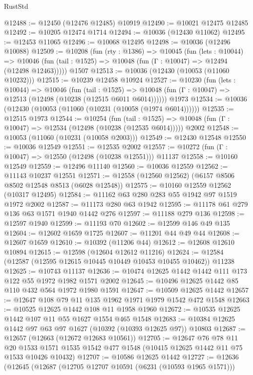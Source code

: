 \begin{lexlean}{RustStd}
\begin{coremodule}
{{@12488 := @12450 (@12476 @12485) @10919
@12490 := @10021 @12475 @12485
@12492 := @10205 @12474 @1714
@12494 := @10036 (@12430 @11062)
@12495 := @12453 @11065
@12496 := @10068 @12495
@12498 := @10036 (@12496 @10088)
@12509 := @10208
    (fun (rty : @1386) =>
    @10045
      (fun (lets : @10044) =>
      @10046 (fun (tail : @1525) => @10048 (fun (Γ : @10047) => @12494 (@12498 @12463)))))
    @1507
@12513 := @10036 (@12430 (@10053 (@11060 @10232)))
@12515 := @10239 @12458 @10924
@12527 := @10230
    (fun (lets : @10044) =>
    @10046
      (fun (tail : @1525) =>
      @10048 (fun (Γ : @10047) => @12513 (@12498 (@10238 (@12515 @6011 @6014))))))
    @1973
@12534 := @10036 (@12430 (@10053 (@11060 (@10231 (@10058 (@1974 @6014))))))
@12535 := @12515 @1973
@12544 := @10254
    (fun (tail : @1525) => @10048 (fun (Γ : @10047) => @12534 (@12498 (@10238 (@12535 @6014)))))
    @2002
@12548 := @10053 (@11060 (@10231 (@10058 @2003)))
@12549 := @12430 @12548
@12550 := @10036 @12549
@12551 := @12535 @2002
@12557 := @10272 (fun (Γ : @10047) => @12550 (@12498 (@10238 @12551))) @11137
@12558 := @10160 @12549
@12559 := @12496 @11140
@12560 := @10036 @12559
@12562 := @11143 @10237 @12551
@12571 := @12558 (@12560 @12562) (@6157 @8506 @8502 @12548 @8513 (@6028 @12548))
@12575 := @10160 @12559 @12562 (@10317 @12495)
@12584 := @11162 @63 @280 @283 @55 @1942 @97 @1519 @1972 @2002
@12587 := @11173 @280 @63 @1942
@12595 := @11178 @61 @279 @136 @63 @1571 @1940 @1442 @276
@12597 := @11188 @279 @136
@12598 := @12597 @1940
@12599 := @11193 @70
@12602 := @12599 @146 @49 @135
@12604 := @12602 @1659 @1725
@12607 := @11201 @44 @49 @44
@12608 := @12607 @1659
@12610 := @10392 (@11206 @44)
@12612 := @12608 @12610 @10894
@12615 := @12598 (@12604 @12612 @11216)
@12624 := @12584 (@12587 (@12595 @12615 @10445 @10449 @10453 @10455 @10462)) @11238
@12625 := @10743 @11137
@12636 := @10474 @12625 @1442 @1442 @111 @173 @122 @55 @1972 @1982 @1571 @2002
@12645 := @10496 @12625 @1442 @85 @110 @432 @564 @1972 @1980 @1591
@12647 := @10509 @12625 @1442
@12657 := @12647 @108 @79 @11 @135 @1962 @1971 @1979 @1542 @472 @1548
@12663 := @10525 @12625 @1442 @108 @11 @1958 @1960
@12672 := @10535 @12625 @1442 @107 @11 @55 @1627 @1554 @465 @1548
@12683 := @10384 @12625 @1442 @97 @63 @97 @1627 (@10392 (@10393 @12625 @97)) @10803
@12687 := @12657 (@12663 (@12672 @12683 @10561))
@12705 := @12647
    @76
    @78
    @11
    @20
    @1533
    @1571
    @1535
    @1542
    @477
    @1548
    (@10415 @12625 @1442 @11 @75 @1533 @10426 @10432)
@12707 := @10586 @12625 @1442
@12727 := @12636
    (@12645
      (@12687
        (@12705 @12707 @10591 (@6231 (@10593 @1965 @1571)))
}}
\end{coremodule}
\end{lexlean}
